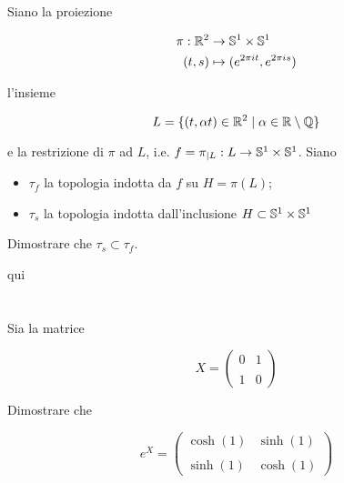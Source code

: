 \begin{tcolorbox}
	Siano la proiezione
	
	\begin{align}
		\begin{split}
			\pi : \R^{2} &\to \S^{1} \times \S^{1}\\
			(t,s) &\mapsto (e^{2 \pi i t},e^{2 \pi i s})
		\end{split}
	\end{align}

	l'insieme
	
	\begin{equation}
		L = \{ (t,\alpha t) \in \R^{2} \mid \alpha \in \R \setminus \Q \}
	\end{equation}

	e la restrizione di $ \pi $ ad $ L $, i.e. $ f = \pi_{|L} : L \to \S^{1} \times \S^{1} $. Siano
	
	\begin{itemize}
		\item $ \tau_{f} $ la topologia indotta da $ f $ su $ H = \pi(L) $;
		
		\item $ \tau_{s} $ la topologia indotta dall'inclusione $ H \subset \S^{1} \times \S^{1} $
	\end{itemize}

	Dimostrare che $ \tau_{s} \subset \tau_{f} $.
\end{tcolorbox}

qui

\tocless\section{}\label{es3-3}

\begin{tcolorbox}
	Sia la matrice
	
	\begin{equation}
		X = \begin{pmatrix} 0 & 1 \\\\ 1 & 0 \end{pmatrix}
	\end{equation}

	Dimostrare che
	
	\begin{equation}
		e^{X} = \begin{pmatrix} \cosh(1) & \sinh(1) \\\\ \sinh(1) & \cosh(1) \end{pmatrix}
	\end{equation}
\end{tcolorbox}

